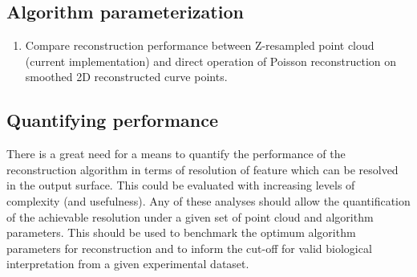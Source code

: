 \documentclass[10pt,a4paper]{article}
\begin{document}
\subsection{Algorithm parameterization}
\begin{enumerate}
	\item Compare reconstruction performance between Z-resampled point cloud (current implementation) and direct operation of Poisson reconstruction on smoothed 2D reconstructed curve points.
\end{enumerate}

\subsection{Quantifying performance}
There is a great need for a means to quantify the performance of the reconstruction algorithm in terms of resolution of feature which can be resolved in the output surface. This could be evaluated with increasing levels of complexity (and usefulness).  Any of these analyses should allow the quantification of the achievable resolution under a given set of point cloud and algorithm parameters.  This should be used to benchmark the optimum algorithm parameters for reconstruction and to inform the cut-off for valid biological interpretation from a given experimental dataset. 
\end{document}
